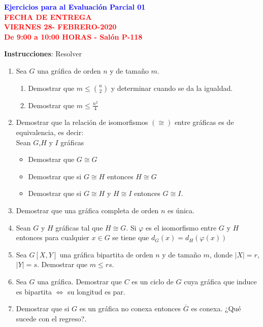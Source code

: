 \documentclass[12pts]{report}
\begin{document}
\begin{center}
\textcolor{blue}{\textbf{\large Ejercicios para al Evaluación Parcial 01}}\\
\vspace{0.5 cm}
\textcolor{red}{\textbf{\large FECHA DE ENTREGA \\ VIERNES 28- FEBRERO-2020\\ De 9:00 a 10:00 HORAS - Salón P-118}}
\end{center}

\textbf{Instrucciones}: Resolver

\vspace{1cm}

\begin{enumerate}
\item Sea $G$ una gráfica de orden $n$ y de tamaño $m$.
\begin{enumerate}
\item Demostrar que $m \leq {n \choose 2}$ y determinar cuando se da la igualdad.
\item Demostrar que $m \leq \frac{n^2}{4}$
\end{enumerate}
\item Demostrar que la relación de isomorfismos $(\cong)$ entre gráficas es de equivalencia, es decir:\\
Sean $G$,$H$ y $I$ gráficas
\begin{itemize}
\item Demostrar que $G \cong G$
\item Demostrar que si $G\cong H$ entonces $H\cong G$
\item Demostrar que si $G\cong H$ y $H\cong I$ entonces $G\cong I$.
\end{itemize}
\item Demostrar que una gráfica completa de orden $n$ es única.
\item Sean $G$ y $H$ gráficas tal que $H\cong G$. Si $\varphi$ es el isomorfismo entre $G$ y $H$ entonces para cualquier $x\in G$ se tiene que $d_G(x) = d_H(\varphi(x))$
\item Sea $G[X,Y]$ una gráfica bipartita de orden $n$ y de tamaño $m$, donde $|X|= r$, $|Y|=s$. Demostrar que
$m\leq rs$.

\item Sea $G$ una gráfica. Demostrar que $C$ es un ciclo de $G$ cuya gráfica que induce es bipartita $\Leftrightarrow $ su longitud es par.

\item Demostrar que si $G$ es un gráfica no conexa entonces $\overline{G}$ es conexa. ¿Qué sucede con el regreso?.


\end{enumerate}
\end{document}
